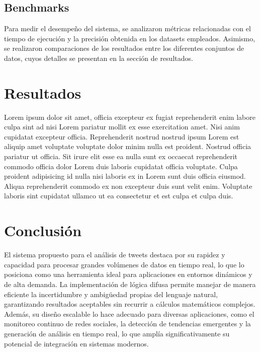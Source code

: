 \documentclass[sigconf, review=false, nonacm]{acmart}
\begin{document}
\subsection{Benchmarks}
Para medir el desempeño del sistema, se analizaron métricas relacionadas
con el tiempo de ejecución y la precisión obtenida en los datasets empleados.
Asimismo, se realizaron comparaciones de los resultados entre los diferentes conjuntos de datos,
cuyos detalles se presentan en la sección de resultados.

\section{Resultados}
Lorem ipsum dolor sit amet, officia excepteur ex fugiat reprehenderit enim labore culpa sint ad nisi Lorem
pariatur mollit ex esse exercitation amet. Nisi anim cupidatat excepteur officia. Reprehenderit nostrud
nostrud ipsum Lorem est aliquip amet voluptate voluptate dolor minim nulla est proident. Nostrud officia
pariatur ut officia. Sit irure elit esse ea nulla sunt ex occaecat reprehenderit commodo officia dolor Lorem
duis laboris cupidatat officia voluptate. Culpa proident adipisicing id nulla nisi laboris ex in Lorem sunt
duis officia eiusmod. Aliqua reprehenderit commodo ex non excepteur duis sunt velit enim. Voluptate laboris
sint cupidatat ullamco ut ea consectetur et est culpa et culpa duis.

\section{Conclusión}
El sistema propuesto para el análisis de tweets destaca por su rapidez y capacidad para procesar grandes
volúmenes de datos en tiempo real, lo que lo posiciona como una herramienta ideal para aplicaciones en
entornos dinámicos y de alta demanda. La implementación de lógica difusa permite manejar de manera eficiente
la incertidumbre y ambigüedad propias del lenguaje natural, garantizando resultados aceptables sin recurrir a
cálculos matemáticos complejos. Además, su diseño escalable lo hace adecuado para diversas aplicaciones, como
el monitoreo continuo de redes sociales, la detección de tendencias emergentes y la generación de análisis en
tiempo real, lo que amplía significativamente su potencial de integración en sistemas modernos.

\nocite{libro}


\end{document}
